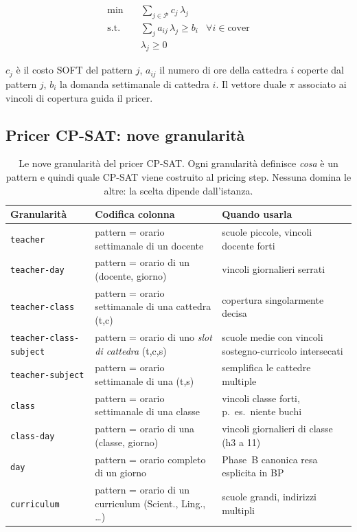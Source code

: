 \begin{align}
\min \quad & \sum_{j \in \mathcal{P}} c_j \, \lambda_j \\
\text{s.t.} \quad & \sum_{j} a_{ij}\, \lambda_j \ge b_i & \forall i \in \text{cover}\\
& \lambda_j \ge 0
\end{align}

\noindent
$c_j$ \`e il costo SOFT del pattern $j$, $a_{ij}$ il numero di
ore della cattedra $i$ coperte dal pattern $j$, $b_i$ la domanda
settimanale di cattedra $i$. Il vettore duale $\pi$ associato ai
vincoli di copertura guida il pricer.

\subsection{Pricer CP-SAT: nove granularit\`a}

\begin{table}[h]
\centering
\sffamily\small
\begin{tabular}{p{3.4cm}p{4.0cm}p{4.0cm}}
\toprule
Granularit\`a & Codifica colonna & Quando usarla \\
\midrule
\texttt{teacher} &
  pattern = orario settimanale di un docente &
  scuole piccole, vincoli docente forti \\
\texttt{teacher-day} &
  pattern = orario di un (docente, giorno) &
  vincoli giornalieri serrati \\
\texttt{teacher-class} &
  pattern = orario settimanale di una cattedra (t,c) &
  copertura singolarmente decisa \\
\texttt{teacher-class-subject} &
  pattern = orario di uno \emph{slot di cattedra} (t,c,s) &
  scuole medie con vincoli sostegno-curricolo intersecati \\
\texttt{teacher-subject} &
  pattern = orario settimanale di una (t,s) &
  semplifica le cattedre multiple \\
\texttt{class} &
  pattern = orario settimanale di una classe &
  vincoli classe forti, p.\ es.\ niente buchi \\
\texttt{class-day} &
  pattern = orario di una (classe, giorno) &
  vincoli giornalieri di classe (h3 a 11) \\
\texttt{day} &
  pattern = orario completo di un giorno &
  Phase~B canonica resa esplicita in BP \\
\texttt{curriculum} &
  pattern = orario di un curriculum (Scient., Ling., \dots) &
  scuole grandi, indirizzi multipli \\
\bottomrule
\end{tabular}
\caption{Le nove granularit\`a del pricer CP-SAT. Ogni
granularit\`a definisce \emph{cosa} \`e un pattern e quindi
quale CP-SAT viene costruito al pricing step. Nessuna domina
le altre: la scelta dipende dall'istanza.}
\label{tab:bp-granularity}
\end{table}

